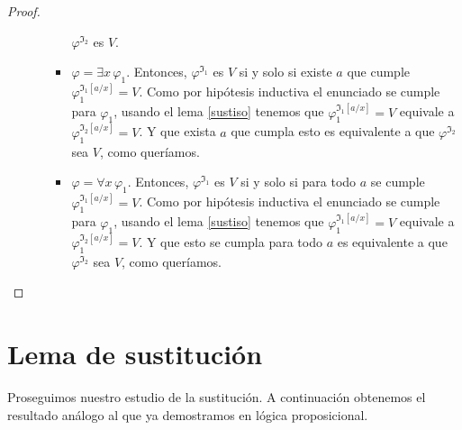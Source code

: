 \begin{proof}
\begin{enumerate}
\begin{itemize}
\begin{itemize}
                    $\varphi^{\mathfrak{I}_2}$ es $V$.
                    \item $\varphi=\exists x \, \varphi_1$. Entonces, $\varphi^{\mathfrak{I}_1}$ es $V$ si y solo si existe $a$ que cumple $\varphi_1^{\mathfrak{I}_1[a/x]}=V$. Como por hipótesis inductiva el enunciado se cumple para $\varphi_1$, usando el lema \ref{sustiso} tenemos que $\varphi_1^{\mathfrak{I}_1[a/x]}=V$ equivale a $\varphi_1^{\mathfrak{I}_2[a/x]}=V$. Y que exista $a$ que cumpla esto es equivalente a que $\varphi^{\mathfrak{I}_2}$ sea $V$, como queríamos.
                    \item $\varphi=\forall x \, \varphi_1$. Entonces, $\varphi^{\mathfrak{I}_1}$ es $V$ si y solo si para todo $a$ se cumple $\varphi_1^{\mathfrak{I}_1[a/x]}=V$. Como por hipótesis inductiva el enunciado se cumple para $\varphi_1$, usando el lema \ref{sustiso} tenemos que $\varphi_1^{\mathfrak{I}_1[a/x]}=V$ equivale a $\varphi_1^{\mathfrak{I}_2[a/x]}=V$. Y que esto se cumpla para todo $a$ es equivalente a que $\varphi^{\mathfrak{I}_2}$ sea $V$, como queríamos.
                    
                \end{itemize}
        \end{itemize}
\end{enumerate}
\end{proof}

\section{Lema de sustitución}

Proseguimos nuestro estudio de la sustitución. A continuación obtenemos el resultado análogo al que ya demostramos en lógica proposicional.

